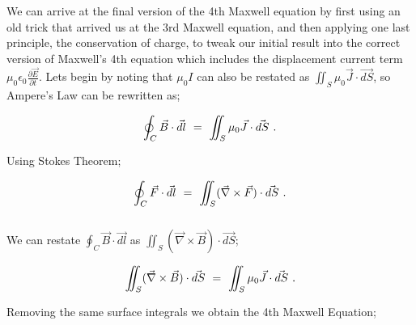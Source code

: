 \documentclass{article}
\begin{document}
We can arrive at the final version of the 4th Maxwell equation by first using an old trick that arrived us at the 3rd Maxwell equation, and then applying one last principle, the conservation of charge, to tweak our initial result into the correct version of Maxwell's 4th equation which includes the displacement current term \begin{math} \mu_{0} \epsilon_{0} \frac{\partial{\vec{E}}}{\partial{t}} \end{math}. Lets begin by noting that \begin{math} \mu_{0} I \end{math} can also be restated as \begin{math} \iint_{S} \mu_{0} \vec{J}\cdot\vec{dS} \end{math}, so Ampere's Law can be rewritten as;

\begin{equation} \label{eq:51}
\oint_{C} \vec{B} \cdot \vec{dl} \hspace{0.125cm} = \hspace{0.125cm} \iint_{S} \mu_{0} \vec{J}\cdot\vec{dS} \hspace{0.125cm} .
\end{equation}

Using Stokes Theorem;

\begin{equation} \label{eq:51}
\oint_{C} \vec{F} \cdot \vec{dl} \hspace{0.125cm} = \hspace{0.125cm} \iint_{S} (\vec{\nabla}\times\vec{F})\cdot\vec{dS} \hspace{0.125cm} .
\end{equation}
\\
We can restate \begin{math} \oint_{C} \vec{B} \cdot \vec{dl} \end{math} as \begin{math} \iint_{S} (\vec{\nabla}\times\vec{B})\cdot\vec{dS} \end{math};

\begin{equation} \label{eq:51}
\iint_{S} (\vec{\nabla}\times\vec{B})\cdot\vec{dS} \hspace{0.125cm} = \hspace{0.125cm} \iint_{S} \mu_{0} \vec{J}\cdot\vec{dS} \hspace{0.125cm} .
\end{equation}

Removing the same surface integrals we obtain the 4th Maxwell Equation;
\end{document}
